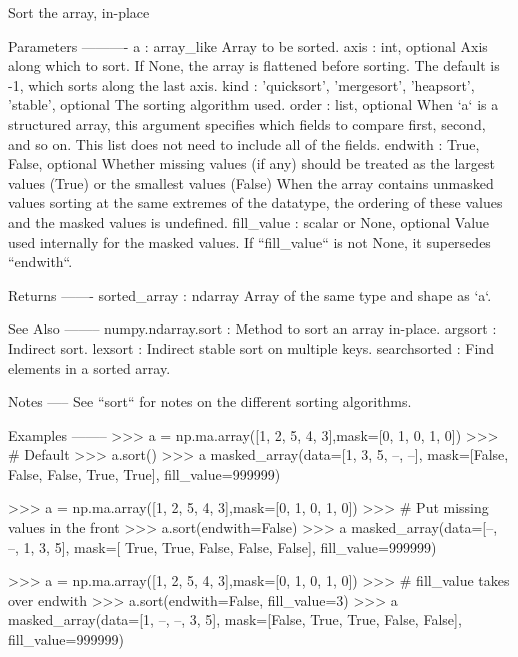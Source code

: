 \begin{DoxyVerb}Sort the array, in-place

Parameters
----------
a : array_like
    Array to be sorted.
axis : int, optional
    Axis along which to sort. If None, the array is flattened before
    sorting. The default is -1, which sorts along the last axis.
kind : {'quicksort', 'mergesort', 'heapsort', 'stable'}, optional
    The sorting algorithm used.
order : list, optional
    When `a` is a structured array, this argument specifies which fields
    to compare first, second, and so on.  This list does not need to
    include all of the fields.
endwith : {True, False}, optional
    Whether missing values (if any) should be treated as the largest values
    (True) or the smallest values (False)
    When the array contains unmasked values sorting at the same extremes of the
    datatype, the ordering of these values and the masked values is
    undefined.
fill_value : scalar or None, optional
    Value used internally for the masked values.
    If ``fill_value`` is not None, it supersedes ``endwith``.

Returns
-------
sorted_array : ndarray
    Array of the same type and shape as `a`.

See Also
--------
numpy.ndarray.sort : Method to sort an array in-place.
argsort : Indirect sort.
lexsort : Indirect stable sort on multiple keys.
searchsorted : Find elements in a sorted array.

Notes
-----
See ``sort`` for notes on the different sorting algorithms.

Examples
--------
>>> a = np.ma.array([1, 2, 5, 4, 3],mask=[0, 1, 0, 1, 0])
>>> # Default
>>> a.sort()
>>> a
masked_array(data=[1, 3, 5, --, --],
     mask=[False, False, False,  True,  True],
       fill_value=999999)

>>> a = np.ma.array([1, 2, 5, 4, 3],mask=[0, 1, 0, 1, 0])
>>> # Put missing values in the front
>>> a.sort(endwith=False)
>>> a
masked_array(data=[--, --, 1, 3, 5],
     mask=[ True,  True, False, False, False],
       fill_value=999999)

>>> a = np.ma.array([1, 2, 5, 4, 3],mask=[0, 1, 0, 1, 0])
>>> # fill_value takes over endwith
>>> a.sort(endwith=False, fill_value=3)
>>> a
masked_array(data=[1, --, --, 3, 5],
     mask=[False,  True,  True, False, False],
       fill_value=999999)\end{DoxyVerb}
 \mbox{\label{classnumpy_1_1ma_1_1core_1_1MaskedArray_a476c54d06af34acac42db9839424a5ef}} 
